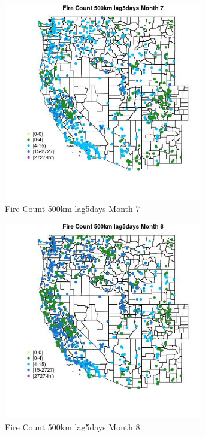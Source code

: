 \begin{figure} 
\centering  
\includegraphics[width=0.77\textwidth]{Code_Outputs/Report_ML_input_PM25_Step4_part_f_de_duplicated_aves_prioritize_24hr_obswNAs_MapObsMo7Fire_Count_500km_lag5days.jpg} 
\caption{\label{fig:Report_ML_input_PM25_Step4_part_f_de_duplicated_aves_prioritize_24hr_obswNAsMapObsMo7Fire_Count_500km_lag5days}Fire Count 500km lag5days Month 7} 
\end{figure} 
 

\begin{figure} 
\centering  
\includegraphics[width=0.77\textwidth]{Code_Outputs/Report_ML_input_PM25_Step4_part_f_de_duplicated_aves_prioritize_24hr_obswNAs_MapObsMo8Fire_Count_500km_lag5days.jpg} 
\caption{\label{fig:Report_ML_input_PM25_Step4_part_f_de_duplicated_aves_prioritize_24hr_obswNAsMapObsMo8Fire_Count_500km_lag5days}Fire Count 500km lag5days Month 8} 
\end{figure} 
 

